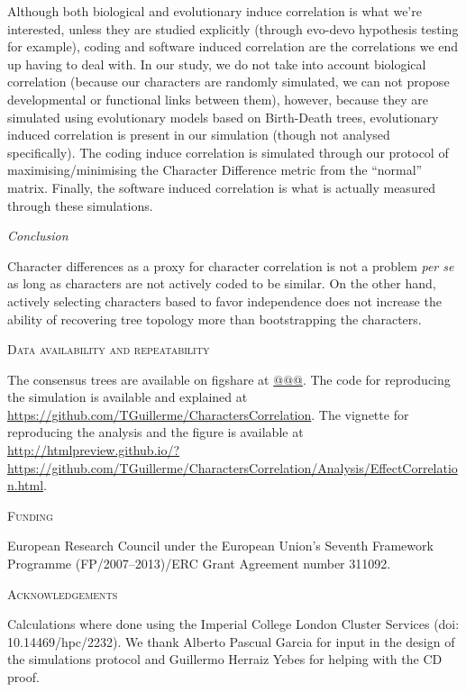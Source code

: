 \documentclass[12pt,letterpaper]{article}
\renewcommand{\section}[1]{%
\bigskip
\begin{center}
\begin{Large}
\normalfont\scshape #1
\medskip
\end{Large}
\end{center}}
\renewcommand{\subsection}[1]{%
\bigskip
\begin{center}
\begin{large}
\normalfont\itshape #1
\end{large}
\end{center}}
\begin{document}
Although both biological and evolutionary induce correlation is what we're interested, unless they are studied explicitly (through evo-devo hypothesis testing for example), coding and software induced correlation are the correlations we end up having to deal with.
In our study, we do not take into account biological correlation (because our characters are randomly simulated, we can not propose developmental or functional links between them), however, because they are simulated using evolutionary models based on Birth-Death trees, evolutionary induced correlation is present in our simulation (though not analysed specifically).
The coding induce correlation is simulated through our protocol of maximising/minimising the Character Difference metric from the ``normal'' matrix.
Finally, the software induced correlation is what is actually measured through these simulations.


\subsection{Conclusion}
Character differences as a proxy for character correlation is not a problem \textit{per se} as long as characters are not actively coded to be similar.
On the other hand, actively selecting characters based to favor independence does not increase the ability of recovering tree topology more than bootstrapping the characters.

\section{Data availability and repeatability}
The consensus trees are available on figshare at \url{@@@}.
The code for reproducing the simulation is available and explained at \url{https://github.com/TGuillerme/CharactersCorrelation}.
The vignette for reproducing the analysis and the figure is available at \url{http://htmlpreview.github.io/?https://github.com/TGuillerme/CharactersCorrelation/Analysis/EffectCorrelation.html}.


\section{Funding}
European Research Council under the European Union’s Seventh Framework Programme (FP/2007–2013)/ERC Grant Agreement number 311092.


\section{Acknowledgements}
Calculations where done using the Imperial College London Cluster Services (doi: 10.14469/hpc/2232).
We thank Alberto Pascual Garcia for input in the design of the simulations protocol and Guillermo Herraiz Yebes for helping with the CD proof.






\end{document}
